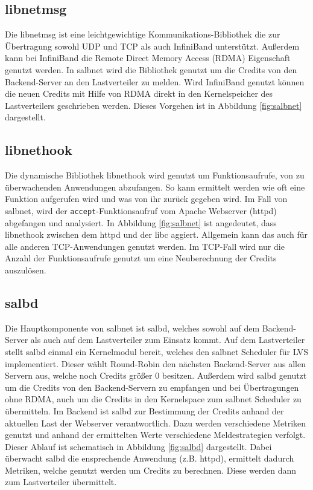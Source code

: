 \documentclass[a4paper, 12pt, BCOR10mm, DIV12, toc=bibliography, toc=listof, german]{scrbook}
\begin{document}
		\subsection*{libnetmsg} %

			Die libnetmsg \cite{rabweg2009} ist eine leichtgewichtige Kommunikations-Bibliothek die zur
			Übertragung sowohl UDP und TCP als auch InfiniBand unterstützt. Außerdem kann bei InfiniBand
			die Remote Direct Memory Access (RDMA) Eigenschaft genutzt werden. In salbnet wird die
			Bibliothek genutzt um die Credits von den Backend-Server an den Lastverteiler zu melden. Wird
			InfiniBand genutzt können die neuen Credits mit Hilfe von RDMA direkt in den Kernelspeicher
			des Lastverteilers geschrieben werden. Dieses Vorgehen ist in Abbildung \ref{fig:salbnet}
			dargestellt.

		
		\subsection*{libnethook} %

			Die dynamische Bibliothek libnethook wird genutzt um Funktionsaufrufe, von zu überwachenden
			Anwendungen abzufangen. So kann ermittelt werden wie oft eine Funktion aufgerufen wird und was
			von ihr zurück gegeben wird. Im Fall von salbnet, wird der \texttt{accept}-Funktionsaufruf vom
			Apache Webserver (httpd) \cite{httpd} abgefangen und analysiert. In
			Abbildung \ref{fig:salbnet} ist angedeutet, dass libnethook zwischen dem httpd und der libc
			aggiert. Allgemein kann das auch für alle anderen TCP-Anwendungen genutzt werden. Im TCP-Fall
			wird nur die Anzahl der Funktionsaufrufe genutzt um eine Neuberechnung der Credits auszulösen.


		\subsection*{salbd} %

			Die Hauptkomponente von salbnet ist salbd, welches sowohl auf dem Backend-Server als auch auf
			dem Lastverteiler zum Einsatz kommt. Auf dem Lastverteiler stellt salbd einmal ein Kernelmodul
			bereit, welches den salbnet Scheduler für LVS implementiert. Dieser wählt Round-Robin den
			nächsten Backend-Server aus allen Servern aus, welche noch Credits größer 0 besitzen. Außerdem
			wird salbd genutzt um die Credits von den Backend-Servern zu empfangen und bei Übertragungen
			ohne RDMA, auch um die Credits in den Kernelspace zum salbnet Scheduler zu übermitteln.  Im
			Backend ist salbd zur Bestimmung der Credits anhand der aktuellen Last der Webserver
			verantwortlich. Dazu werden verschiedene Metriken genutzt und anhand der ermittelten Werte
			verschiedene Meldestrategien verfolgt. Dieser Ablauf ist schematisch in Abbildung
			\ref{fig:salbd} dargestellt. Dabei überwacht salbd die ensprechende Anwendung (z.B.
			httpd), ermittelt dadurch Metriken, welche genutzt werden um Credits zu berechnen. Diese
			werden dann zum Lastverteiler übermittelt.
\end{document}
